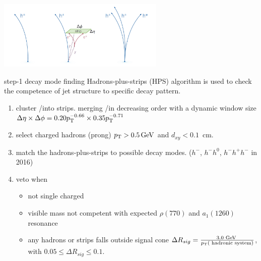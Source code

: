 \begin{frame}{}
\smaller
    \begin{center}
        \includegraphics[width=0.6\textwidth]{slides/figures/tauReco.png}
    \end{center}
    \begin{block}{step-1 decay mode finding}
    Hadrons-plus-strips (HPS) algorithm is used to check the competence of jet structure to specific \PGth decay pattern.
    \begin{enumerate}
        \item cluster \Pe/\PGg into strips. merging \Pe/\PGg in \pt decreasing order with a dynamic window size $\Delta\eta \times \Delta \phi = 0.20p_{\mathrm{T}}^{-0.66} \times 0.35 p_{\mathrm{T}}^{-0.71}$ 
        \item select charged hadrons (prong) $p_{\mathrm{T}}>0.5\,\text{Ge\hspace{-.08em}V}$ and $d_{xy}<0.1$~cm.
        \item match the hadrons-plus-strips to possible \PGth decay modes. ($h^-$, $h^- h^0$, $h^- h^+ h^-$ in 2016)
        \item veto when
        \begin{itemize} 
        \smaller
            \item not single charged
            \item visible mass not competent with expected $\rho (770)$ and $a_1(1260)$ resonance
            \item any hadrons or strips falls outside signal cone $\Delta R_{sig} = \frac{3.0 \text{ GeV } } { p_{\mathrm{T}} (\text{ hadronic system})  }$, with $0.05 \leq \Delta R_{sig} \leq 0.1.$
        \end{itemize}
    \end{enumerate}  
    \end{block}
\end{frame}


